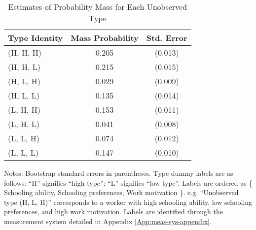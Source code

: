 \begin{table}[ht]
\caption{Estimates of Probability Mass for Each Unobserved Type}
\label{tab:type_mass}
\centering
\begin{threeparttable}
\begin{tabular}{lcc}
\toprule
Type Identity  & Mass Probability  & Std. Error \\ 
\midrule
(H, H, H) & 0.205 & (0.013) \\ 
(H, H, L) & 0.215 & (0.015) \\ 
(H, L, H) & 0.029 & (0.009) \\ 
(H, L, L) & 0.135 & (0.014) \\ 
(L, H, H) & 0.153 & (0.011) \\ 
(L, H, L) & 0.041 & (0.008) \\ 
(L, L, H) & 0.074 & (0.012) \\ 
(L, L, L) & 0.147 & (0.010) \\ 
\bottomrule
\end{tabular}
\footnotesize Notes: Bootstrap standard errors in parentheses. Type dummy labels are as follows: ``H'' signifies ``high type''; ``L'' signifies ``low type''. Labels are ordered as \{ Schooling ability, Schooling preferences, Work motivation \}. e.g. ``Unobserved type (H, L, H)'' corresponds to a worker with high schooling ability, low schooling preferences, and high work motivation.  Labels are identified through the measurement system detailed in Appendix \ref{App:meas-sys-appendix}. 
\end{threeparttable}
\end{table}
